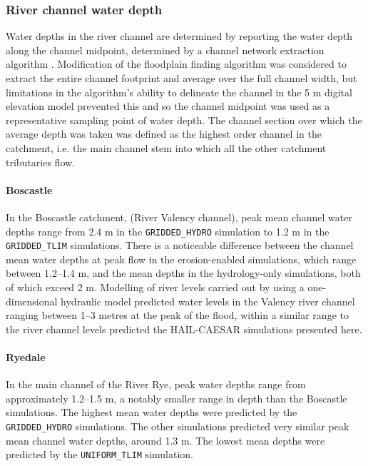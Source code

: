 \subsubsection{River channel water depth}
Water depths in the river channel are determined by reporting the water depth along the channel midpoint, determined by a channel network extraction algorithm \citep{Braun2013}. Modification of the floodplain finding algorithm was considered to extract the entire channel footprint and average over the full channel width, but limitations in the algorithm's ability to delineate the channel in the 5 m digital elevation model prevented this and so the channel midpoint was used as a representative sampling point of water depth. The channel section over which the average depth was taken was defined as the highest order channel in the catchment, i.e. the main channel stem into which all the other catchment tributaries flow.

\paragraph{Boscastle}
In the Boscastle catchment, (River Valency channel), peak mean channel water depths range from 2.4 m in the \texttt{GRIDDED\_HYDRO} simulation to 1.2 m in the \texttt{GRIDDED\_TLIM} simulations. There is a noticeable difference between the channel mean water depths at peak flow in the erosion-enabled simulations, which range between 1.2--1.4 m, and the mean depths in the hydrology-only simulations, both of which exceed 2 m. Modelling of river levels carried out by \citet[][figures 6.14, 6.15 in the report]{wallingford2005flooding} using a one-dimensional hydraulic model predicted water levels in the Valency river channel ranging between 1--3 metres at the peak of the flood, within a similar range to the river channel levels predicted the HAIL-CAESAR simulations presented here. 

\paragraph{Ryedale}
In the main channel of the River Rye, peak water depths range from approximately 1.2--1.5 m, a notably smaller range in depth than the Boscastle simulations. The highest mean water depths were predicted by the \texttt{GRIDDED\_HYDRO} simulations. The other simulations predicted very similar peak mean channel water depths, around 1.3 m. The lowest mean depths were predicted by the \texttt{UNIFORM\_TLIM} simulation.  

